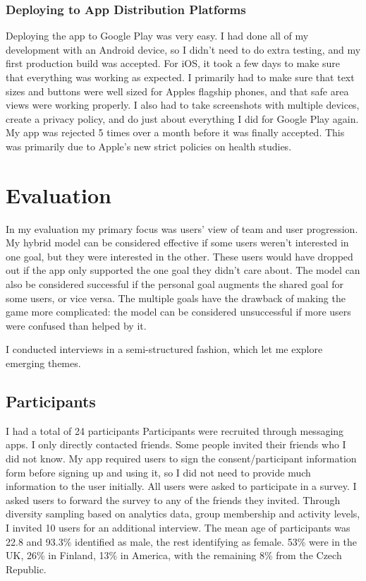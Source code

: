 \documentclass{l4proj}
\begin{document}
\subsection{Deploying to App Distribution Platforms}
Deploying the app to Google Play was very easy. I had done all of my development with an Android device, so I didn't need to do extra testing, and my first production build was accepted. For iOS, it took a few days to make sure that everything was working as expected. I primarily had to make sure that text sizes and buttons were well sized for Apples flagship phones, and that safe area views were working properly. I also had to take screenshots with multiple devices, create a privacy policy, and do just about everything I did for Google Play again. My app was rejected 5 times over a month before it was finally accepted. This was primarily due to Apple's new strict policies on health studies.

\chapter{Evaluation}
In my evaluation my primary focus was users' view of team and user progression. My hybrid model can be considered effective if some users weren't interested in one goal, but they were interested in the other. These users would have dropped out if the app only supported the one goal they didn't care about. The model can also be considered successful if the personal goal augments the shared goal for some users, or vice versa. The multiple goals have the drawback of making the game more complicated: the model can be considered unsuccessful if more users were confused than helped by it. 

I conducted interviews in a semi-structured fashion, which let me explore emerging themes.  

\section{Participants}
I had a total of 24 participants Participants were recruited through messaging apps. I only directly contacted friends. Some people invited their friends who I did not know. My app required users to sign the consent/participant information form before signing up and using it, so I did not need to provide much information to the user initially. All users were asked to participate in a survey. I asked users to forward the survey to any of the friends they invited. Through diversity sampling based on analytics data, group membership and activity levels, I invited 10 users for an additional interview. The mean age of participants was 22.8 and 93.3\% identified as male, the rest identifying as female. 53\% were in the UK, 26\% in Finland, 13\% in America, with the remaining 8\% from the Czech Republic. 
\end{document}
